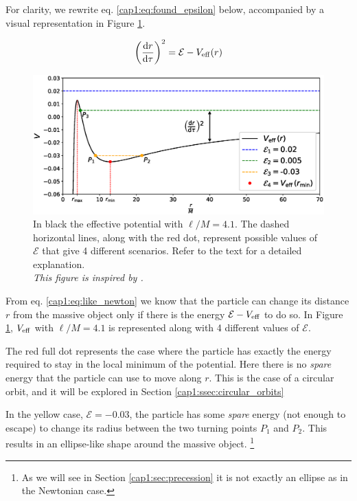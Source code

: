 For clarity, we rewrite eq. \ref{cap1:eq:found_epsilon} below, accompanied by a
visual representation in Figure \ref{cap1:fig:V_eff_orbits}.

\begin{equation}
    \left( \dv{r}{\tau} \right)^2 = \mathcal E - V_{\rm eff} (r)
    \label{cap1:eq:like_newton}
\end{equation}

\begin{figure}[h]
    \centering
    \includegraphics[width = \textwidth]{Figures/chapter1/V_eff_orbits.eps}
    \caption{In black the effective potential with $\ell / M = 4.1$.
    The dashed horizontal lines, along with the red dot, represent possible
    values of $\mathcal E$ that give 4 different scenarios.
    Refer to the text for a detailed explanation. \\
    \textit{This figure is inspired by
    \cite[page 245, Figure 12.2]{shapiro2008black}.}}
    \label{cap1:fig:V_eff_orbits}
\end{figure}

From eq. \ref{cap1:eq:like_newton} we know that the particle can change its
distance $r$ from the massive object only if there is the energy
$\mathcal E - V_{\rm eff}$ to do so.
In Figure \ref{cap1:fig:V_eff_orbits}, $V_{\rm eff}$ with $\ell / M = 4.1$ is
represented along with 4 different values of $\mathcal E$.

The red full dot represents the case where the particle has exactly the energy
required to stay in the local minimum of the potential.
Here there is no \textit{spare} energy that the particle can use to move along
$r$.
This is the case of a circular orbit, and it will be explored in Section
\ref{cap1:ssec:circular_orbits}

In the yellow case, $\mathcal E = -0.03$, the particle has some \textit{spare}
energy (not enough to escape) to change its radius between the two turning
points $P_1$ and $P_2$.
This results in an ellipse-like shape around the massive object.
\footnote{As we will see in Section \ref{cap1:sec:precession} it is not
exactly an ellipse as in the Newtonian case.}

